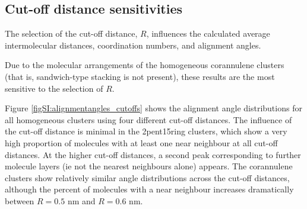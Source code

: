 \subsection{Cut-off distance sensitivities}
The selection of the cut-off distance, $R$, influences the calculated average intermolecular distances, coordination numbers, and alignment angles.

Due to the molecular arrangements of the homogeneous corannulene clusters (that is, sandwich-type stacking is not present), these results are the most sensitive to the selection of $R$.


Figure \ref{figSI:alignmentangles_cutoffs} shows the alignment angle distributions for all homogeneous clusters using four different cut-off distances.  The influence of the cut-off distance is minimal in the 2pent15ring clusters, which show a very high proportion of molecules with at least one near neighbour at all cut-off distances.  At the higher cut-off distances, a second peak corresponding to further molecule layers (ie not the nearest neighbours alone) appears.  The corannulene clusters show relatively similar angle distributions across the cut-off distances, although the percent of molecules with a near neighbour increases dramatically between $R=0.5$ nm and $R=0.6$ nm.  
%
